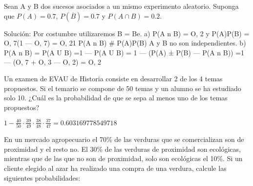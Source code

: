 \documentclass[addpoints,spanish, 12pt,a4paper]{exam}
\begin{document}
\begin{questions}



\question Sean A y B dos sucesos asociados a un mismo experimento aleatorio. Suponga que $P(A) = 0. 7$, $P(\overline{B}) = 0.7$ y $P(A\cap B) = 0.2$. 



\begin{solution}
Solución: Por costumbre utilizaremos B = Be. 
a) P(A n B) = O, 2 y P(A)P(B) = O, 7(1 — O, 7) = O, 21 P(A n B) # P(A)P(B) A y B no son independientes. 
b) P(A n B) = P(A U B) =1 — P(A U B) = 1 — (P(A) ± P(B) — P(A n B)) =1 — (O, 7 + O, 3 — O, 2) = O, 2  
\end{solution}

\question[1] Un examen de EVAU de Historia consiste en desarrollar 2 de los 4 temas propuestos. Si el temario se compone de 50 temas y un alumno se ha estudiado solo 10. ¿Cuál es la probabilidad de que se sepa al menos uno de los temas propuestos? 
\begin{solution}
    $1-\frac{40}{50}\cdot\frac{39}{49}\cdot\frac{38}{48}\cdot\frac{37}{47}= 0.603169778549718$
\end{solution}

\question En un mercado agropecuario el 70\% de las verduras que se comercializan son de proximidad y el resto no. El 30\% de las verduras de proximidad son ecológicas, mientras que de las que no son de proximidad, solo son ecológicas el 10\%. Si un cliente elegido al azar ha realizado una compra de una verdura, calcule las siguientes probabilidades: 
\end{questions}
\end{document}
